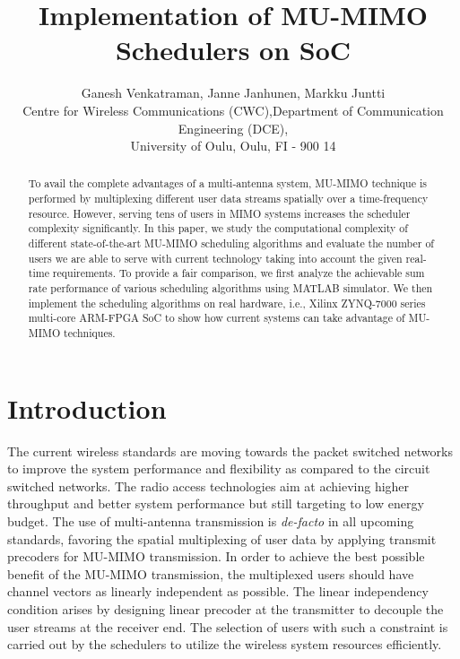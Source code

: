 \documentclass[conference]{./../../IEEE/IEEEtran}
\begin{document}
\title{Implementation of MU-MIMO Schedulers on SoC}

\author{\begin{tabular}{cc}
\multicolumn{2}{c}{Ganesh Venkatraman, Janne Janhunen, Markku Juntti}\\
Centre for Wireless Communications (CWC), & Department of Communication Engineering (DCE), \\
\multicolumn{2}{c}{University of Oulu, Oulu, FI - 900 14}\\
\end{tabular}}

\maketitle


\begin{abstract}
	
To avail the complete advantages of a multi-antenna system, \ac{MU-MIMO} technique is performed by multiplexing different user data streams spatially over a time-frequency resource. However, serving tens of users in \ac{MIMO} systems increases the scheduler complexity significantly. In this paper, we study the computational complexity of different state-of-the-art \ac{MU-MIMO} scheduling algorithms and evaluate the number of users we are able to serve with current technology taking into account the given real-time requirements. To provide a fair comparison, we first analyze the achievable sum rate performance of various scheduling algorithms using MATLAB simulator. We then implement the scheduling algorithms on real hardware, i.e., Xilinx ZYNQ-7000 series multi-core ARM-FPGA \ac{SoC} to show how current systems can take advantage of \ac{MU-MIMO} techniques.
\end{abstract}

\acresetall
{}
\section{Introduction}
The current wireless standards are moving towards the packet switched networks to improve the system performance and flexibility as compared to the circuit switched networks. The radio access technologies aim at achieving higher throughput and better system performance but still targeting to low energy budget. The use of multi-antenna transmission is \textit{de-facto} in all upcoming standards, favoring the spatial multiplexing of user data by applying transmit precoders for \ac{MU-MIMO} transmission. In order to achieve the best possible benefit of the \ac{MU-MIMO} transmission, the multiplexed users should have channel vectors as linearly independent as possible. The linear independency condition arises by designing linear precoder at the transmitter to decouple the user streams at the receiver end. The selection of users with such a constraint is carried out by the schedulers to utilize the wireless system resources efficiently.
\end{document}
